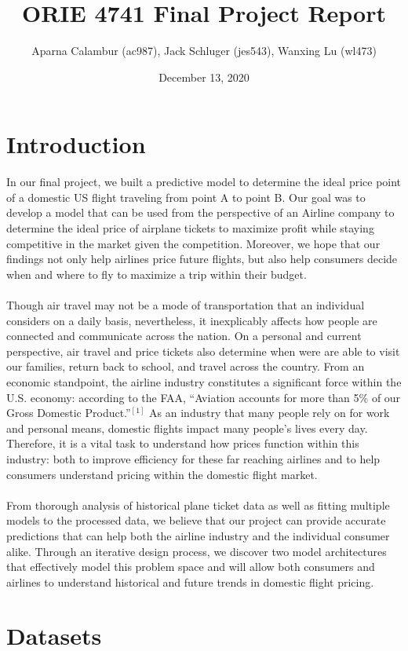 \documentclass{article}
\title{ORIE 4741 Final Project Report}
\author{Aparna Calambur (ac987), Jack Schluger (jes543), Wanxing Lu (wl473)}
\date{December 13, 2020}
\begin{document}
\twocolumn
\maketitle

\section{Introduction}
In our final project, we built a predictive model to determine the ideal price point of a domestic US flight traveling from point A to point B. Our goal was to develop a model that can be used from the perspective of an Airline company to determine the ideal price of airplane tickets to maximize profit while staying competitive in the market given the competition. Moreover, we hope that our findings not only help airlines price future flights, but also help consumers decide when and where to fly to maximize a trip within their budget.\\\\
Though air travel may not be a mode of transportation that an individual considers on a daily basis, nevertheless, it inexplicably affects how people are connected and communicate across the nation. On a personal and current perspective, air travel and price tickets also determine when were are able to visit our families, return back to school, and travel across the country. From an economic standpoint, the airline industry constitutes a significant force within the U.S. economy: according to the FAA, “Aviation accounts for more than 5\% of our Gross Domestic Product.”$^{[1]}$ As an industry that many people rely on for work and personal means, domestic flights impact many people’s lives every day. Therefore, it is a vital task to understand how prices function within this industry: both to improve efficiency for these far reaching airlines and to help consumers understand pricing within the domestic flight market.\\\\
From thorough analysis of historical plane ticket data as well as fitting multiple models to the processed data, we believe that our project can provide accurate predictions that can help both the airline industry and the individual consumer alike. Through an iterative design process, we discover two model architectures that effectively model this problem space and will allow both consumers and airlines to understand historical and future trends in domestic flight pricing. 


\section{Datasets}
\end{document}
